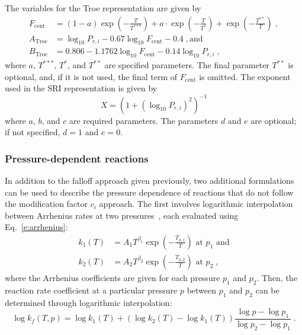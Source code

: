 \documentclass[preprint,12pt]{elsarticle}
\begin{document}
The variables for the Troe representation are given by
\begin{align}
F_{\text{cent}} &= (1 - a) \exp \left( -\frac{T}{T^{***}} \right) + a\cdot \exp \left( -\frac{T}{T^*} \right) + \exp \left( -\frac{T^{**}}{T} \right) \;, \\
A_{\text{Troe}} &= \log_{10} P_{r,i} - 0.67 \log_{10} F_{\text{cent}} - 0.4 \;, \text{and} \\
B_{\text{Troe}} &= 0.806 - 1.1762 \log_{10} F_{\text{cent}} - 0.14 \log_{10} P_{r,i} \;,
\end{align}
where $a$, $T^{***}$, $T^*$, and $T^{**}$ are specified parameters.
The final parameter $T^{**}$ is optional, and, if it is not used, the final term of $F_{\text{cent}}$ is omitted.
The exponent used in the SRI representation is given by
\begin{equation}
X = \left( 1 + \left( \log_{10} P_{r,i} \right)^2 \right)^{-1}
\end{equation}
where $a$, $b$, and $c$ are required parameters.
The parameters $d$ and $e$ are optional; if not specified, $d = 1$ and $e = 0$.

\subsubsection{Pressure-dependent reactions}

In addition to the falloff approach given previously, two additional formulations can be used to describe the pressure dependence of reactions that do not follow the modification factor $c_i$ approach.
The first involves logarithmic interpolation between Arrhenius rates at two pressures~\cite{chemkin:2012,Goodwin:2015aa}, each evaluated using Eq.~\eqref{e:arrhenius}:
\begin{align}
k_1 (T) &= A_1 T^{\beta_1} \exp \left( -\frac{T_{a, 1}}{T} \right) \text{ at } p_1 \text{ and} \label{e:plog_k1} \\
k_2 (T) &= A_2 T^{\beta_2} \exp \left( -\frac{T_{a, 2}}{T} \right) \text{ at } p_2 \;, \label{e:plog_k2}
\end{align}
where the Arrhenius coefficients are given for each pressure $p_1$ and $p_2$.
Then, the reaction rate coefficient at a particular pressure $p$ between $p_1$ and $p_2$ can be determined through logarithmic interpolation:
\begin{equation}
\log k_f (T, p) = \log k_1 (T) + \left( \log k_2 (T) - \log k_1 (T) \right) \frac{\log p - \log p_1}{\log p_2 - \log p_1} \;. \label{e:plog}
\end{equation}
\end{document}
